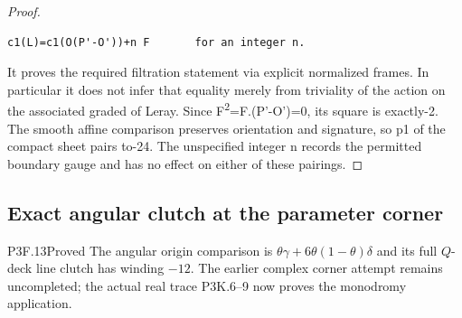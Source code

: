 \begin{proof}
\begin{lstlisting}
c1(L)=c1(O(P'-O'))+n F       for an integer n.
\end{lstlisting}

It proves the required filtration statement via explicit normalized frames. In particular it does not infer that equality merely from triviality of the action on the associated graded of Leray. Since F\textsuperscript{2}=F.(P'-O')=0, its square is exactly-2. The smooth affine comparison preserves orientation and signature, so p1 of the compact sheet pairs to-24. The unspecified integer n records the permitted boundary gauge and has no effect on either of these pairings.
\end{proof}
\subsection{Exact angular clutch at the parameter corner}
\begin{statement}{P3F.13}{Proved}
The angular origin comparison is $\theta\gamma+6\theta(1-\theta)\delta$ and its full $Q$-deck line clutch has winding $-12$. The earlier complex corner attempt remains uncompleted; the actual real trace P3K.6--9 now proves the monodromy application.
\end{statement}
